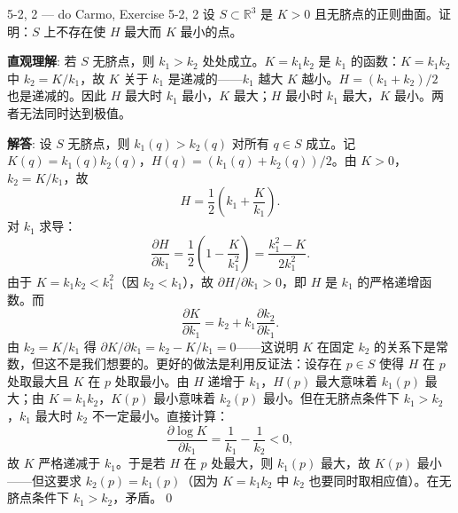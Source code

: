 \begin{exercise}{5-2, 2 — do Carmo, Exercise 5-2, 2}
设 $S \subset \mathbb{R}^3$ 是 $K>0$ 且无脐点的正则曲面。证明：$S$ 上不存在使 $H$ 最大而 $K$ 最小的点。
\end{exercise}
\begin{solution}
\textbf{直观理解}: 若 $S$ 无脐点，则 $k_1 > k_2$ 处处成立。$K = k_1k_2$ 是 $k_1$ 的函数：$K = k_1k_2$ 中 $k_2 = K/k_1$，故 $K$ 关于 $k_1$ 是递减的——$k_1$ 越大 $K$ 越小。$H = (k_1+k_2)/2$ 也是递减的。因此 $H$ 最大时 $k_1$ 最小，$K$ 最大；$H$ 最小时 $k_1$ 最大，$K$ 最小。两者无法同时达到极值。

\textbf{解答}: 设 $S$ 无脐点，则 $k_1(q) > k_2(q)$ 对所有 $q \in S$ 成立。记 $K(q) = k_1(q)k_2(q)$，$H(q) = (k_1(q)+k_2(q))/2$。由 $K>0$，$k_2 = K/k_1$，故
\[
H = \frac{1}{2}\left(k_1 + \frac{K}{k_1}\right).
\]
对 $k_1$ 求导：
\[
\frac{\partial H}{\partial k_1} = \frac{1}{2}\left(1 - \frac{K}{k_1^2}\right) = \frac{k_1^2 - K}{2k_1^2}.
\]
由于 $K = k_1k_2 < k_1^2$（因 $k_2 < k_1$），故 $\partial H/\partial k_1 > 0$，即 $H$ 是 $k_1$ 的严格递增函数。而
\[
\frac{\partial K}{\partial k_1} = k_2 + k_1\frac{\partial k_2}{\partial k_1}.
\]
由 $k_2 = K/k_1$ 得 $\partial K/\partial k_1 = k_2 - K/k_1 = 0$——这说明 $K$ 在固定 $k_2$ 的关系下是常数，但这不是我们想要的。更好的做法是利用反证法：设存在 $p \in S$ 使得 $H$ 在 $p$ 处取最大且 $K$ 在 $p$ 处取最小。由 $H$ 递增于 $k_1$，$H(p)$ 最大意味着 $k_1(p)$ 最大；由 $K = k_1k_2$，$K(p)$ 最小意味着 $k_2(p)$ 最小。但在无脐点条件下 $k_1 > k_2$，$k_1$ 最大时 $k_2$ 不一定最小。直接计算：
\[
\frac{\partial \log K}{\partial k_1} = \frac{1}{k_1} - \frac{1}{k_2} < 0,
\]
故 $K$ 严格递减于 $k_1$。于是若 $H$ 在 $p$ 处最大，则 $k_1(p)$ 最大，故 $K(p)$ 最小——但这要求 $k_2(p) = k_1(p)$（因为 $K=k_1k_2$ 中 $k_2$ 也要同时取相应值）。在无脐点条件下 $k_1 > k_2$，矛盾。\qed
\end{solution}

